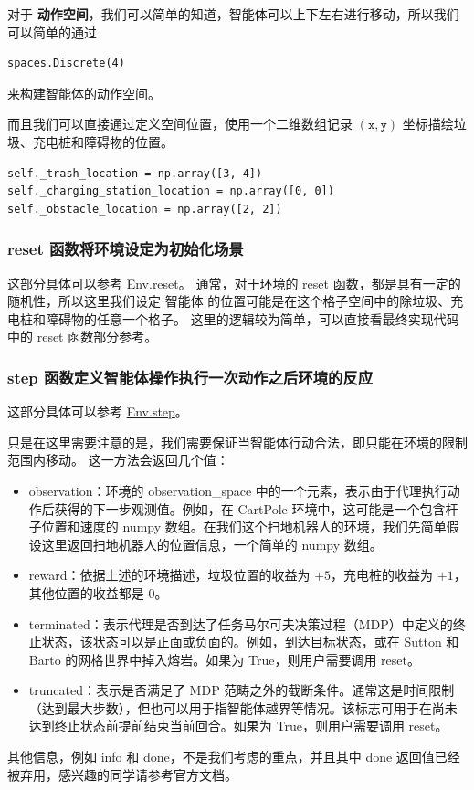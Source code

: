 对于 \textbf{动作空间}，我们可以简单的知道，智能体可以上下左右进行移动，所以我们可以简单的通过 
\begin{verbatim}
spaces.Discrete(4)
\end{verbatim}
来构建智能体的动作空间。

而且我们可以直接通过定义空间位置，使用一个二维数组记录 \(\left( \texttt{x}, \texttt{y} \right)\) 坐标描绘垃圾、充电桩和障碍物的位置。
\begin{verbatim}
self._trash_location = np.array([3, 4])
self._charging_station_location = np.array([0, 0])
self._obstacle_location = np.array([2, 2])
\end{verbatim}

\subsubsection{\textsf{reset} 函数将环境设定为初始化场景}

这部分具体可以参考 \href{https://gymnasium.farama.org/api/env/#gymnasium.Env.reset}{\textsf{Env.reset}}。
通常，对于环境的 \textsf{reset} 函数，都是具有一定的随机性，所以这里我们设定 智能体 的位置可能是在这个格子空间中的除垃圾、充电桩和障碍物的任意一个格子。
这里的逻辑较为简单，可以直接看最终实现代码中的 \textsf{reset} 函数部分参考。

\subsubsection{\textsf{step} 函数定义智能体操作执行一次动作之后环境的反应}

这部分具体可以参考 \href{https://gymnasium.farama.org/api/env/#gymnasium.Env.step}{\textsf{Env.step}}。

只是在这里需要注意的是，我们需要保证当智能体行动合法，即只能在环境的限制范围内移动。
这一方法会返回几个值：
\begin{itemize}
    \item observation：环境的 observation\_space 中的一个元素，表示由于代理执行动作后获得的下一步观测值。例如，在 CartPole 环境中，这可能是一个包含杆子位置和速度的 numpy 数组。在我们这个扫地机器人的环境，我们先简单假设这里返回扫地机器人的位置信息，一个简单的 numpy 数组。
    \item reward：依据上述的环境描述，垃圾位置的收益为 \(+5\)，充电桩的收益为 \(+1\)，其他位置的收益都是 \(0\)。
    \item terminated：表示代理是否到达了任务马尔可夫决策过程（MDP）中定义的终止状态，该状态可以是正面或负面的。例如，到达目标状态，或在 Sutton 和 Barto 的网格世界中掉入熔岩。如果为 True，则用户需要调用 \textsf{reset}。
    \item truncated：表示是否满足了 MDP 范畴之外的截断条件。通常这是时间限制（达到最大步数），但也可以用于指智能体越界等情况。该标志可用于在尚未达到终止状态前提前结束当前回合。如果为 True，则用户需要调用 \textsf{reset}。
\end{itemize}
其他信息，例如 info 和 done，不是我们考虑的重点，并且其中 done 返回值已经被弃用，感兴趣的同学请参考官方文档。

